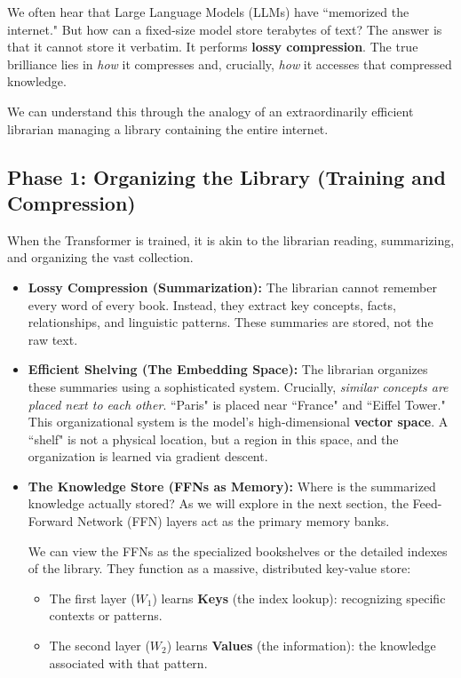 \documentclass{article}
\begin{document}
We often hear that Large Language Models (LLMs) have ``memorized the internet." But how can a fixed-size model store terabytes of text? The answer is that it cannot store it verbatim. It performs \textbf{lossy compression}. The true brilliance lies in \emph{how} it compresses and, crucially, \emph{how} it accesses that compressed knowledge.

We can understand this through the analogy of an extraordinarily efficient librarian managing a library containing the entire internet.

\subsection{Phase 1: Organizing the Library (Training and Compression)}

When the Transformer is trained, it is akin to the librarian reading, summarizing, and organizing the vast collection.

\begin{itemize}
   \item \textbf{Lossy Compression (Summarization):} The librarian cannot remember every word of every book. Instead, they extract key concepts, facts, relationships, and linguistic patterns. These summaries are stored, not the raw text.
   \item \textbf{Efficient Shelving (The Embedding Space):} The librarian organizes these summaries using a sophisticated system. Crucially, \emph{similar concepts are placed next to each other}. ``Paris" is placed near ``France" and ``Eiffel Tower." This organizational system is the model's high-dimensional \textbf{vector space}. A ``shelf" is not a physical location, but a region in this space, and the organization is learned via gradient descent.
   \item \textbf{The Knowledge Store (FFNs as Memory):} Where is the summarized knowledge actually stored? As we will explore in the next section, the Feed-Forward Network (FFN) layers act as the primary memory banks.
   \begin{tcolorbox}[colback=gray!10!white, colframe=gray!50!black, title=FFNs as the Bookshelves]
   We can view the FFNs as the specialized bookshelves or the detailed indexes of the library. They function as a massive, distributed key-value store:
   \begin{itemize}
     \item The first layer ($W_1$) learns \textbf{Keys} (the index lookup): recognizing specific contexts or patterns.
     \item The second layer ($W_2$) learns \textbf{Values} (the information): the knowledge associated with that pattern.
   \end{itemize}
   \end{tcolorbox}
\end{itemize}
\end{document}
